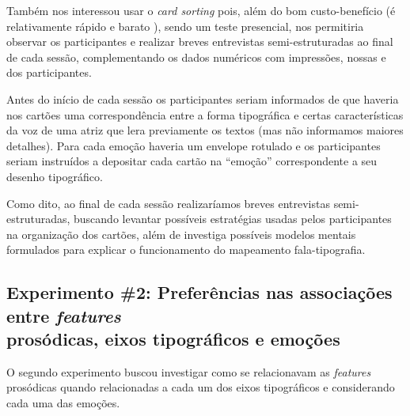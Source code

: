\documentclass[a4paper]{tufte-handout}
\begin{document}
Também nos interessou usar o \textit{card sorting} pois, além do bom custo-benefício (é relativamente rápido e barato \citep{goodman2006card}), sendo um teste presencial, nos permitiria observar os participantes e realizar breves entrevistas semi-estruturadas ao final de cada sessão, complementando os dados numéricos com impressões, nossas e dos participantes.

Antes do início de cada sessão os participantes seriam informados de que haveria nos cartões uma correspondência entre a forma tipográfica e certas características da voz de uma atriz que lera previamente os textos (mas não informamos maiores detalhes). Para cada emoção haveria um envelope rotulado e os participantes seriam instruídos a depositar cada cartão na ``emoção'' correspondente a seu desenho tipográfico. 

Como dito, ao final de cada sessão realizaríamos breves entrevistas semi-estruturadas, buscando levantar possíveis estratégias usadas pelos participantes na organização dos cartões, além de investiga possíveis modelos mentais formulados para explicar o funcionamento do mapeamento fala-tipografia.

\subsection{Experimento \#2: Preferências nas associações entre \textit{features} \protect\\prosódicas, eixos tipográficos e emoções}\label{sec:met_exp_2}




O segundo experimento buscou investigar como se relacionavam as \textit{features} prosódicas quando relacionadas a cada um dos eixos tipográficos e considerando cada uma das emoções.
\end{document}
